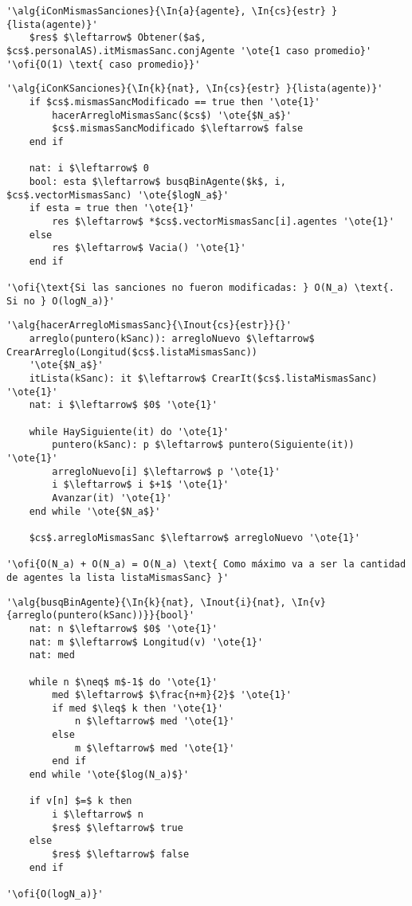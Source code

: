 \begin{lstlisting}[mathescape]
'\alg{iConMismasSanciones}{\In{a}{agente}, \In{cs}{estr} }{lista(agente)}'
	$res$ $\leftarrow$ Obtener($a$, $cs$.personalAS).itMismasSanc.conjAgente '\ote{1 caso promedio}'
'\ofi{O(1) \text{ caso promedio}}'
\end{lstlisting}

\begin{lstlisting}[mathescape]
'\alg{iConKSanciones}{\In{k}{nat}, \In{cs}{estr} }{lista(agente)}'
	if $cs$.mismasSancModificado == true then '\ote{1}'
		hacerArregloMismasSanc($cs$) '\ote{$N_a$}'
		$cs$.mismasSancModificado $\leftarrow$ false
	end if
	
	nat: i $\leftarrow$ 0
	bool: esta $\leftarrow$ busqBinAgente($k$, i, $cs$.vectorMismasSanc) '\ote{$logN_a$}'
	if esta = true then '\ote{1}'
		res $\leftarrow$ *$cs$.vectorMismasSanc[i].agentes '\ote{1}'
	else
		res $\leftarrow$ Vacia() '\ote{1}'
	end if

'\ofi{\text{Si las sanciones no fueron modificadas: } O(N_a) \text{. Si no } O(logN_a)}'
\end{lstlisting}

\begin{lstlisting}[mathescape]
'\alg{hacerArregloMismasSanc}{\Inout{cs}{estr}}{}'
	arreglo(puntero(kSanc)): arregloNuevo $\leftarrow$ CrearArreglo(Longitud($cs$.listaMismasSanc)) 
	'\ote{$N_a$}'
	itLista(kSanc): it $\leftarrow$ CrearIt($cs$.listaMismasSanc) '\ote{1}'
	nat: i $\leftarrow$ $0$ '\ote{1}'

	while HaySiguiente(it) do '\ote{1}'
		puntero(kSanc): p $\leftarrow$ puntero(Siguiente(it)) '\ote{1}'
		arregloNuevo[i] $\leftarrow$ p '\ote{1}'
		i $\leftarrow$ i $+1$ '\ote{1}'
		Avanzar(it) '\ote{1}'
	end while '\ote{$N_a$}'
	
	$cs$.arregloMismasSanc $\leftarrow$ arregloNuevo '\ote{1}'

'\ofi{O(N_a) + O(N_a) = O(N_a) \text{ Como máximo va a ser la cantidad de agentes la lista listaMismasSanc} }'
\end{lstlisting}

\begin{lstlisting}[mathescape]
'\alg{busqBinAgente}{\In{k}{nat}, \Inout{i}{nat}, \In{v}{arreglo(puntero(kSanc))}}{bool}'
	nat: n $\leftarrow$ $0$ '\ote{1}'
	nat: m $\leftarrow$ Longitud(v) '\ote{1}'
	nat: med
	
	while n $\neq$ m$-1$ do '\ote{1}'
		med $\leftarrow$ $\frac{n+m}{2}$ '\ote{1}'
		if med $\leq$ k then '\ote{1}'
			n $\leftarrow$ med '\ote{1}'
		else
			m $\leftarrow$ med '\ote{1}'
		end if
	end while '\ote{$log(N_a)$}'

	if v[n] $=$ k then
		i $\leftarrow$ n
		$res$ $\leftarrow$ true
	else
		$res$ $\leftarrow$ false
	end if

'\ofi{O(logN_a)}'
\end{lstlisting}

